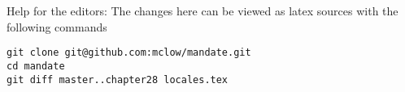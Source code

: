 
\vfill
Help for the editors: The changes here can be viewed as latex sources with the following commands
\begin{verbatim}
git clone git@github.com:mclow/mandate.git
cd mandate
git diff master..chapter28 locales.tex
\end{verbatim}

